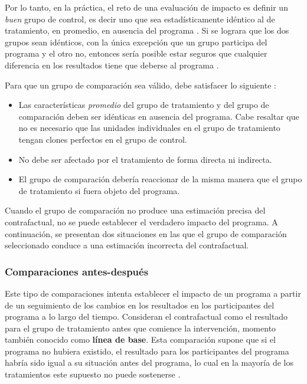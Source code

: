 \documentclass[../../main.tex]{subfiles}
\begin{document}
Por lo tanto, en la práctica, el reto de una evaluación de impacto es definir un \textit{buen} grupo de control, es decir uno que sea estadísticamente idéntico al de tratamiento, en promedio, en ausencia del programa \cite{gertler-2016}. Si se lograra que los dos grupos sean idénticos, con la única excepción que un grupo participa del programa y el otro no, entonces sería posible estar seguros que cualquier diferencia en los resultados tiene que deberse al programa \cite{gertler-2016}.

Para que un grupo de comparación sea válido, debe satisfacer lo siguiente \cite{gertler-2016}:
\begin{itemize}
    \item Las características \textit{promedio} del grupo de tratamiento y del grupo de comparación deben ser idénticas en ausencia del programa. Cabe resaltar que no es necesario que las unidades individuales en el grupo de tratamiento tengan clones perfectos en el grupo de control.
    \item No debe ser afectado por el tratamiento de forma directa ni indirecta.
    \item El grupo de comparación debería reaccionar de la misma manera que el grupo de tratamiento si fuera objeto del programa.
\end{itemize}

Cuando el grupo de comparación no produce una estimación precisa del contrafactual, no se puede establecer el verdadero impacto del programa. A continuación, se presentan dos situaciones en las que el grupo de comparación seleccionado conduce a una estimación incorrecta del contrafactual.

\subsubsection{Comparaciones antes-después}
Este tipo de comparaciones intenta establecer el impacto de un programa a partir de un seguimiento de los cambios en los resultados en los participantes del programa a lo largo del tiempo. Consideran el contrafactual como el resultado para el grupo de tratamiento antes que comience la intervención, momento también conocido como \textbf{línea de base}. Esta comparación supone que si el programa no hubiera existido, el resultado para los participantes del programa habría sido igual a su situación antes del programa, lo cual en la mayoría de los tratamientos este supuesto no puede sostenerse \cite{gertler-2016}.
\end{document}
